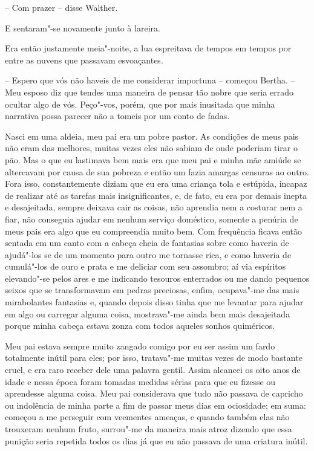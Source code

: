 -- Com prazer -- disse Walther.

E sentaram"-se novamente junto à lareira.

Era então justamente meia"-noite, a lua espreitava de tempos em tempos
por entre as nuvens que passavam esvoaçantes.

-- Espero que vós não haveis de me considerar importuna -- começou
Bertha. -- Meu esposo diz que tendes uma maneira de pensar tão nobre que
seria errado ocultar algo de vós. Peço"-vos, porém, que por mais
inusitada que minha narrativa possa parecer não a tomeis por um conto
de fadas.

Nasci em uma aldeia, meu pai era um pobre pastor. As condições de meus
pais não eram das melhores, muitas vezes eles não sabiam de onde
poderiam tirar o pão. Mas o que eu lastimava bem mais era que meu pai e
minha mãe amiúde se altercavam por causa de sua pobreza e então um
fazia amargas censuras ao outro. Fora isso, constantemente diziam que
eu era uma criança tola e estúpida, incapaz de realizar até as tarefas
mais insignificantes, e, de fato, eu era por demais inepta e
desajeitada, sempre deixava cair as coisas, não aprendia nem a costurar
nem a fiar, não conseguia ajudar em nenhum serviço doméstico, somente a
penúria de meus pais era algo que eu compreendia muito bem. Com frequência
ficava então sentada em um canto com a cabeça cheia de fantasias sobre
como haveria de ajudá"-los se de um momento para outro me tornasse rica,
e como haveria de cumulá"-los de ouro e prata e me \mbox{deliciar} com seu
assombro; aí via espíritos elevando"-se pelos ares e me indicando
tesouros enterrados ou me dando pequenos seixos que se transformavam em
pedras preciosas, enfim, ocupava"-me das mais mirabolantes fantasias e,
quando depois disso tinha que me levantar para ajudar em algo ou
carregar alguma coisa, mostrava"-me ainda bem mais desajeitada porque
minha cabeça estava zonza com todos aqueles sonhos quiméricos.

Meu pai estava sempre muito zangado comigo por eu ser assim um fardo
totalmente inútil para eles; por isso, tratava"-me muitas vezes de modo
bastante cruel, e era raro receber dele uma palavra gentil. Assim
alcancei os oito anos de idade e nessa época foram
tomadas medidas sérias para que eu fizesse ou aprendesse alguma coisa.
Meu pai considerava que tudo não passava de capricho ou indolência de
minha parte a fim de passar meus dias em ociosidade; em suma: 
começou a me perseguir com veementes ameaças, e quando também elas não
trouxeram nenhum fruto, surrou"-me da maneira mais atroz dizendo que
essa punição seria repetida todos os dias já que eu não passava de uma
criatura inútil.

